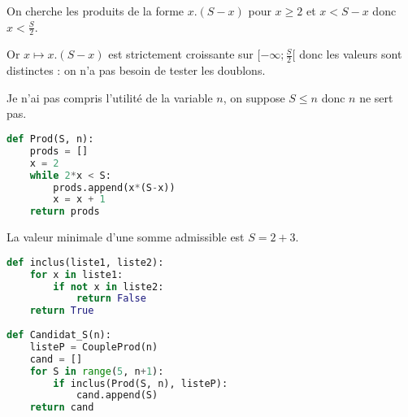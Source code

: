 \begin{Exercise}
On cherche les produits de la forme $x.(S-x)$ pour $x\ge 2$ et $x< S-x$ donc $x<\frac S2$.

Or $x \mapsto x.(S-x)$ est strictement croissante sur $[-\infty ;\frac S2[$ donc les valeurs sont distinctes : on n'a pas besoin de tester les doublons. 

Je n'ai pas compris l'utilité de la variable $n$, on suppose $S \le n$ donc $n$ ne sert pas.

\newpage

\begin{lstlisting}[language=python]
def Prod(S, n):
    prods = []
    x = 2
    while 2*x < S:
        prods.append(x*(S-x))
        x = x + 1
    return prods
\end{lstlisting}
\end{Exercise}
\begin{Exercise}
La valeur minimale d'une somme admissible est $S = 2 + 3$.
   

\begin{lstlisting}[language=python]
def inclus(liste1, liste2):
    for x in liste1:
        if not x in liste2:
            return False
    return True
    
def Candidat_S(n):
    listeP = CoupleProd(n)
    cand = []
    for S in range(5, n+1):
        if inclus(Prod(S, n), listeP):
            cand.append(S)
    return cand        
\end{lstlisting}
\end{Exercise}
